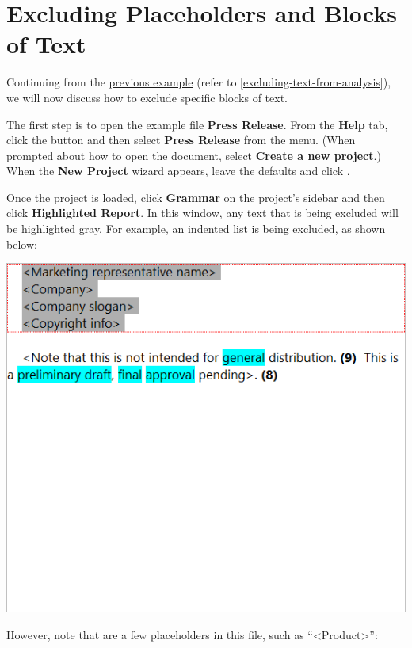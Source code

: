 \documentclass[
]{book}
\theoremstyle{definition}
\theoremstyle{definition}
\theoremstyle{definition}
\theoremstyle{definition}
\theoremstyle{remark}
\begin{document}
\hypertarget{excluding-placeholders}{%
\section{Excluding Placeholders and Blocks of Text}\label{excluding-placeholders}}

Continuing from the \protect\hyperlink{excluding-text-from-analysis}{previous example} (refer to \ref{excluding-text-from-analysis}), we will now discuss how to exclude specific blocks of text.

The first step is to open the example file \textbf{Press Release}. From the \textbf{Help} tab, click the  button and then select \textbf{Press Release} from the menu. (When prompted about how to open the document, select \textbf{Create a new project}.) When the \textbf{New Project} wizard appears, leave the defaults and click .

Once the project is loaded, click \textbf{Grammar} on the project's sidebar and then click \textbf{Highlighted Report}. In this window, any text that is being excluded will be highlighted gray. For example, an indented list is being excluded, as shown below:

\includegraphics{Images/ExclusionTagsExampleListExcluded.png}

However, note that are a few placeholders in this file, such as ``\textless Product\textgreater{}'':
\end{document}
